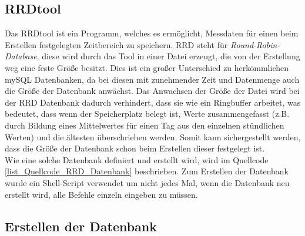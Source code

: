 \subsection*{RRDtool}
Das RRDtool ist ein Programm, welches es ermöglicht, Messdaten für einen beim Erstellen festgelegten Zeitbereich zu speichern. RRD steht für \textit{Round-Robin-Database}, diese wird durch das Tool in einer Datei erzeugt, die von der Erstellung weg eine feste Größe besitzt. Dies ist ein großer Unterschied zu herkömmlichen mySQL Datenbanken, da bei diesen mit zunehmender Zeit und Datenmenge auch die Größe der Datenbank anwächst. Das Anwachsen der Größe der Datei wird bei der RRD Datenbank dadurch verhindert, dass sie wie ein Ringbuffer arbeitet, was bedeutet, dass wenn der Speicherplatz belegt ist, Werte zusammengefasst (z.B. durch Bildung eines Mittelwertes für einen Tag aus den einzelnen stündlichen Werten) und die ältesten überschrieben werden. Somit kann sichergestellt werden, dass die Größe der Datenbank schon beim Erstellen dieser festgelegt ist.\\
Wie eine solche Datenbank definiert und erstellt wird, wird im Quellcode \ref{list_Quellcode_RRD_Datenbank} beschrieben. Zum Erstellen der Datenbank wurde ein Shell-Script verwendet um nicht jedes Mal, wenn die Datenbank neu erstellt wird, alle Befehle einzeln eingeben zu müssen.

\subsection*{Erstellen der Datenbank}
\label{subsection_Erstellen_DB_DS18S20}


